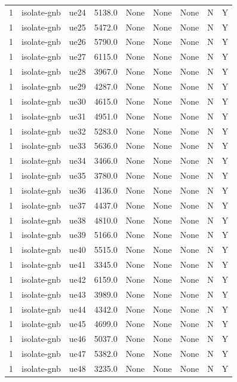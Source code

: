 \begin{table}[ht]
\begin{tabular}{|c|c|c|c|c|c|c|c|c|}
1 & isolate-gnb & ue24 & 5138.0 & None & None & None & N & Y \\
1 & isolate-gnb & ue25 & 5472.0 & None & None & None & N & Y \\
1 & isolate-gnb & ue26 & 5790.0 & None & None & None & N & Y \\
1 & isolate-gnb & ue27 & 6115.0 & None & None & None & N & Y \\
1 & isolate-gnb & ue28 & 3967.0 & None & None & None & N & Y \\
1 & isolate-gnb & ue29 & 4287.0 & None & None & None & N & Y \\
1 & isolate-gnb & ue30 & 4615.0 & None & None & None & N & Y \\
1 & isolate-gnb & ue31 & 4951.0 & None & None & None & N & Y \\
1 & isolate-gnb & ue32 & 5283.0 & None & None & None & N & Y \\
1 & isolate-gnb & ue33 & 5636.0 & None & None & None & N & Y \\
1 & isolate-gnb & ue34 & 3466.0 & None & None & None & N & Y \\
1 & isolate-gnb & ue35 & 3780.0 & None & None & None & N & Y \\
1 & isolate-gnb & ue36 & 4136.0 & None & None & None & N & Y \\
1 & isolate-gnb & ue37 & 4437.0 & None & None & None & N & Y \\
1 & isolate-gnb & ue38 & 4810.0 & None & None & None & N & Y \\
1 & isolate-gnb & ue39 & 5166.0 & None & None & None & N & Y \\
1 & isolate-gnb & ue40 & 5515.0 & None & None & None & N & Y \\
1 & isolate-gnb & ue41 & 3345.0 & None & None & None & N & Y \\
1 & isolate-gnb & ue42 & 6159.0 & None & None & None & N & Y \\
1 & isolate-gnb & ue43 & 3989.0 & None & None & None & N & Y \\
1 & isolate-gnb & ue44 & 4342.0 & None & None & None & N & Y \\
1 & isolate-gnb & ue45 & 4699.0 & None & None & None & N & Y \\
1 & isolate-gnb & ue46 & 5037.0 & None & None & None & N & Y \\
1 & isolate-gnb & ue47 & 5382.0 & None & None & None & N & Y \\
1 & isolate-gnb & ue48 & 3235.0 & None & None & None & N & Y \\

\end{tabular}
\end{table}
